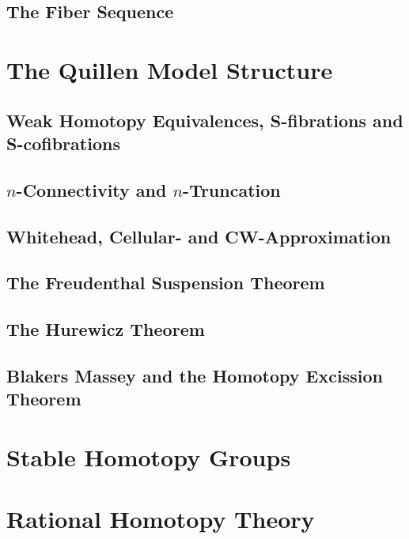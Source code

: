 	\subsection{The Fiber Sequence}

	\newpage
	\section{The Quillen Model Structure}
	\subsection{Weak Homotopy Equivalences, S-fibrations and S-cofibrations}
	\subsection{$n$-Connectivity and $n$-Truncation}
	\subsection{Whitehead, Cellular- and CW-Approximation}
	\subsection{The Freudenthal Suspension Theorem}
	\subsection{The Hurewicz Theorem}
	\subsection{Blakers Massey and the Homotopy Excission Theorem}

	\newpage
	\section{Stable Homotopy Groups}

	\newpage
	\section{Rational Homotopy Theory}
